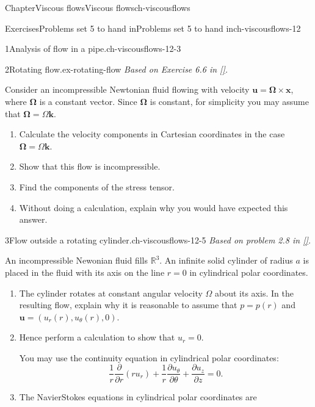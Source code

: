 \documentclass[oneside,10pt,]{book}
\newcommand{\xreffont}{\relax}
\numberwithin{equation}{section}
\newcommand{\pd}[2]{\frac{\partial#1}{\partial#2}}
\newcommand{\bx}{\boldsymbol{x}}
\newcommand{\bu}{\boldsymbol{u}}
\newcommand{\bOmega}{\boldsymbol{\Omega}}
\newcommand{\bk}{\boldsymbol{k}}
\begin{document}
\begin{chapterptx}{Chapter}{Viscous flows}{}{Viscous flows}{}{}{ch-viscousflows}
\begin{exercises-section}{Exercises}{Problems set 5 to hand in}{}{Problems set 5 to hand in}{}{}{ch-viscousflows-12}
\begin{divisionexercise}{1}{Analysis of flow in a pipe.}{}{ch-viscousflows-12-3}
\begin{enumerate}[font=\bfseries,label=(\alph*),ref=\alph*]
\end{enumerate}%
\end{divisionexercise}%
\begin{divisionexercise}{2}{Rotating flow.}{}{ex-rotating-flow}%
\emph{Based on Exercise 6.6 in \hyperlink{ref-acheson}{[{\xreffont 4}]}.}%
 \par
Consider an incompressible Newtonian fluid flowing with velocity \(\bu=\bOmega\times\bx\), where \(\bOmega\) is a constant vector. Since \(\bOmega\) is constant, for simplicity you may assume that \(\bOmega=\Omega\bk\).%
\begin{enumerate}[font=\bfseries,label=(\alph*),ref=\alph*]%
\item{}Calculate the velocity components in Cartesian coordinates in the case \(\bOmega=\Omega\bk\).%
\item{}Show that this flow is incompressible.%
\item{}Find the components of the stress tensor.%
\item{}Without doing a calculation, explain why you would have expected this answer.%
\end{enumerate}%
\end{divisionexercise}%
\begin{divisionexercise}{3}{Flow outside a rotating cylinder.}{}{ch-viscousflows-12-5}%
\emph{Based on problem 2.8 in \hyperlink{ref-acheson}{[{\xreffont 4}]}.}%
 \par
An incompressible Newonian fluid fills \(\mathbb{R}^3\). An infinite solid cylinder of radius \(a\) is placed in the fluid with its axis on the line \(r=0\) in cylindrical polar coordinates.%
\begin{enumerate}[font=\bfseries,label=(\alph*),ref=\alph*]%
\item{}The cylinder rotates at constant angular velocity \(\Omega\) about its axis. In the resulting flow, explain why it is reasonable to assume that \(p=p(r)\) and \(\bu=(u_r(r),u_\theta(r),0)\).%
\item{}Hence perform a calculation to show that \(u_r=0\).%
\par
You may use the continuity equation in cylindrical polar coordinates:%
\begin{equation*}
\frac{1}{r}\pd{}{r}(ru_r)+\frac{1}{r}\pd{u_\theta}{\theta}+\pd{u_z}{z}=0.
\end{equation*}
%
\item{}The Navier\textendash{}Stokes equations in cylindrical polar coordinates are%
\begin{align*}

\end{align*}
\end{enumerate}
\end{divisionexercise}
\end{exercises-section}
\end{chapterptx}
\end{document}
